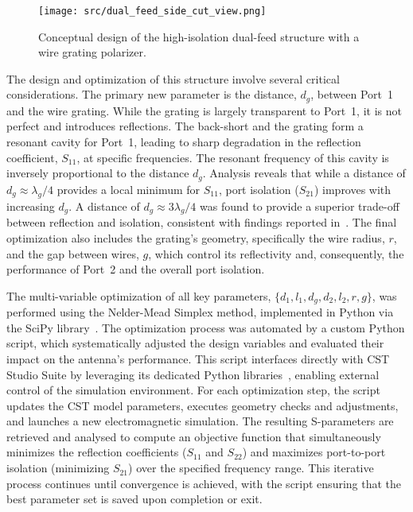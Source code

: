 \documentclass[journal]{IEEEtran}
\begin{document}
\begin{figure}[!b]
    \centering
    \texttt{[image: src/dual\_feed\_side\_cut\_view.png]}
    \caption{\label{fig:dual-feed-conceptual}Conceptual design of the high-isolation dual-feed structure with a wire grating polarizer.}
\end{figure}

The design and optimization of this structure involve several critical considerations. The primary new parameter is the distance, $d_g$, between Port~1 and the wire grating. While the grating is largely transparent to Port~1, it is not perfect and introduces reflections. The back-short and the grating form a resonant cavity for Port~1, leading to sharp degradation in the reflection coefficient, $S_{11}$, at specific frequencies. The resonant frequency of this cavity is inversely proportional to the distance $d_g$. Analysis reveals that while a distance of $d_g \approx \lambda_g/4$ provides a local minimum for $S_{11}$, port isolation ($S_{21}$) improves with increasing $d_g$. A distance of $d_g \approx 3\lambda_g/4$ was found to provide a superior trade-off between reflection and isolation, consistent with findings reported in~\cite{karki-et-al:dual-polarized-probe-for-planar-near-field-measurement}. The final optimization also includes the grating's geometry, specifically the wire radius, $r$, and the gap between wires, $g$, which control its reflectivity and, consequently, the performance of Port~2 and the overall port isolation.

The multi-variable optimization of all key parameters, $\{d_1, l_1, d_g, d_2, l_2, r, g\}$, was performed using the Nelder-Mead Simplex method, implemented in Python via the SciPy library~\cite{virtanen-et-al:scipy}. The optimization process was automated by a custom Python script, which systematically adjusted the design variables and evaluated their impact on the antenna's performance. This script interfaces directly with CST Studio Suite by leveraging its dedicated Python libraries~\cite{cst:python-libraries-documentation}, enabling external control of the simulation environment. For each optimization step, the script updates the CST model parameters, executes geometry checks and adjustments, and launches a new electromagnetic simulation. The resulting S-parameters are retrieved and analysed to compute an objective function that simultaneously minimizes the reflection coefficients ($S_{11}$ and $S_{22}$) and maximizes port-to-port isolation (minimizing $S_{21}$) over the specified frequency range. This iterative process continues until convergence is achieved, with the script ensuring that the best parameter set is saved upon completion or exit.
\end{document}

